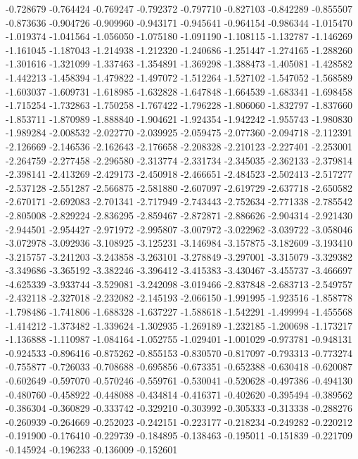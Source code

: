 -0.728679
-0.764424
-0.769247
-0.792372
-0.797710
-0.827103
-0.842289
-0.855507
-0.873636
-0.904726
-0.909960
-0.943171
-0.945641
-0.964154
-0.986344
-1.015470
-1.019374
-1.041564
-1.056050
-1.075180
-1.091190
-1.108115
-1.132787
-1.146269
-1.161045
-1.187043
-1.214938
-1.212320
-1.240686
-1.251447
-1.274165
-1.288260
-1.301616
-1.321099
-1.337463
-1.354891
-1.369298
-1.388473
-1.405081
-1.428582
-1.442213
-1.458394
-1.479822
-1.497072
-1.512264
-1.527102
-1.547052
-1.568589
-1.603037
-1.609731
-1.618985
-1.632828
-1.647848
-1.664539
-1.683341
-1.698458
-1.715254
-1.732863
-1.750258
-1.767422
-1.796228
-1.806060
-1.832797
-1.837660
-1.853711
-1.870989
-1.888840
-1.904621
-1.924354
-1.942242
-1.955743
-1.980830
-1.989284
-2.008532
-2.022770
-2.039925
-2.059475
-2.077360
-2.094718
-2.112391
-2.126669
-2.146536
-2.162643
-2.176658
-2.208328
-2.210123
-2.227401
-2.253001
-2.264759
-2.277458
-2.296580
-2.313774
-2.331734
-2.345035
-2.362133
-2.379814
-2.398141
-2.413269
-2.429173
-2.450918
-2.466651
-2.484523
-2.502413
-2.517277
-2.537128
-2.551287
-2.566875
-2.581880
-2.607097
-2.619729
-2.637718
-2.650582
-2.670171
-2.692083
-2.701341
-2.717949
-2.743443
-2.752634
-2.771338
-2.785542
-2.805008
-2.829224
-2.836295
-2.859467
-2.872871
-2.886626
-2.904314
-2.921430
-2.944501
-2.954427
-2.971972
-2.995807
-3.007972
-3.022962
-3.039722
-3.058046
-3.072978
-3.092936
-3.108925
-3.125231
-3.146984
-3.157875
-3.182609
-3.193410
-3.215757
-3.241203
-3.243858
-3.263101
-3.278849
-3.297001
-3.315079
-3.329382
-3.349686
-3.365192
-3.382246
-3.396412
-3.415383
-3.430467
-3.455737
-3.466697
-4.625339
-3.933744
-3.529081
-3.242098
-3.019466
-2.837848
-2.683713
-2.549757
-2.432118
-2.327018
-2.232082
-2.145193
-2.066150
-1.991995
-1.923516
-1.858778
-1.798486
-1.741806
-1.688328
-1.637227
-1.588618
-1.542291
-1.499994
-1.455568
-1.414212
-1.373482
-1.339624
-1.302935
-1.269189
-1.232185
-1.200698
-1.173217
-1.136888
-1.110987
-1.084164
-1.052755
-1.029401
-1.001029
-0.973781
-0.948131
-0.924533
-0.896416
-0.875262
-0.855153
-0.830570
-0.817097
-0.793313
-0.773274
-0.755877
-0.726033
-0.708688
-0.695856
-0.673351
-0.652388
-0.630418
-0.620087
-0.602649
-0.597070
-0.570246
-0.559761
-0.530041
-0.520628
-0.497386
-0.494130
-0.480760
-0.458922
-0.448088
-0.434814
-0.416371
-0.402620
-0.395494
-0.389562
-0.386304
-0.360829
-0.333742
-0.329210
-0.303992
-0.305333
-0.313338
-0.288276
-0.260939
-0.264669
-0.252023
-0.242151
-0.223177
-0.218234
-0.249282
-0.220212
-0.191900
-0.176410
-0.229739
-0.184895
-0.138463
-0.195011
-0.151839
-0.221709
-0.145924
-0.196233
-0.136009
-0.152601
